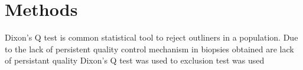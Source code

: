 \chapter{Methods}

Dixon's Q test is common statistical tool to reject outliners in a population. Due to the lack of persistent quality control mechanism in  biopsies obtained are lack of persistant quality Dixon's Q test was used to   exclusion test was used 